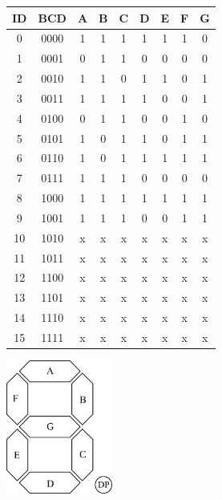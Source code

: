 \documentclass[11pt]{article}
\begin{document}
\noindent
\begin{minipage}{.5\textwidth}


\begin{center}
\begin{tabular}{|c|c|ccccccc|}
\hline
ID & BCD & A & B & C & D & E & F & G\\
\hline
0 & 0000 & 1 & 1 & 1 & 1 & 1 & 1 & 0\\
1 & 0001 & 0 & 1 & 1 & 0 & 0 & 0 & 0\\
2 & 0010 & 1 & 1 & 0 & 1 & 1 & 0 & 1\\
3 & 0011 & 1 & 1 & 1 & 1 & 0 & 0 & 1\\
4 & 0100 & 0 & 1 & 1 & 0 & 0 & 1 & 0\\
5 & 0101 & 1 & 0 & 1 & 1 & 0 & 1 & 1\\
6 & 0110 & 1 & 0 & 1 & 1 & 1 & 1 & 1\\
7 & 0111 & 1 & 1 & 1 & 0 & 0 & 0 & 0\\
8 & 1000 & 1 & 1 & 1 & 1 & 1 & 1 & 1\\
9 & 1001 & 1 & 1 & 1 & 0 & 0 & 1 & 1\\
10 & 1010 & x & x & x & x & x & x & x\\
11 & 1011 & x & x & x & x & x & x & x\\
12 & 1100 & x & x & x & x & x & x & x\\
13 & 1101 & x & x & x & x & x & x & x\\
14 & 1110 & x & x & x & x & x & x & x\\
15 & 1111 & x & x & x & x & x & x & x\\
\hline
\end{tabular}
\end{center}
\end{minipage}
\begin{minipage}{.5\textwidth}


\begin{center}
\includegraphics[width=3.5cm]{./7_Segment_Display.png}
\end{center}
\end{minipage}
\end{document}
